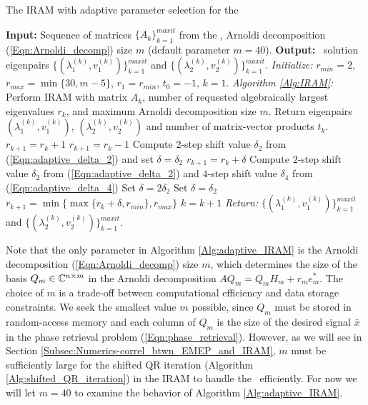 \begin{algorithm}[H]
\caption{The IRAM with adaptive parameter selection for the \emep}	\label{Alg:adaptive_IRAM}

\begin{algorithmic}[1]
	\Statex 	\textbf{Input:} Sequence of matrices $\{ A_k \}_{k=1}^{maxit}$ from the \emep, Arnoldi decomposition (\ref{Eqn:Arnoldi_decomp})  size $m$ (default parameter $m = 40$).
	\Statex 	\textbf{Output:} \emep \ solution eigenpairs $\{ (\lambda_1^{(k)}, v_1^{(k)}) \}_{k=1}^{maxit}$ and  $\{ (\lambda_2^{(k)}, v_2^{(k)}) \}_{k=1}^{maxit}$.
	\State		\textit{Initialize:} $r_{min}=2$, $r_{max} = \min\{ 30, m-5 \}$, $r_1=r_{min}$, $t_0=-1$, $k=1$.
		\State		\textit{Algorithm \ref{Alg:IRAM}:} Perform IRAM with matrix $A_k$, number of requested algebraically largest eigenvalues $r_k$, and maximum Arnoldi decomposition size $m$.  Return eigenpairs $(\lambda_1^{(k)}, v_1^{(k)} )$, $(\lambda_2^{(k)}, v_2^{(k)} )$ and number of matrix-vector products $t_k$.
			\State 		$r_{k+1} = r_k + 1$
			\State		$r_{k+1} = r_k - 1$
			\State		Compute $2$-step shift value $\delta_2$ from (\ref{Eqn:adaptive_delta_2}) and set $\delta = \delta_2$
			\State		$r_{k+1} = r_k + \delta$
		\Else
			\State 		Compute $2$-step shift value $\delta_2$ from (\ref{Eqn:adaptive_delta_2}) and $4$-step shift value $\delta_4$ from (\ref{Eqn:adaptive_delta_4})
				\State		Set $\delta = 2\delta_2$
			\Else
				\State 			Set $\delta = \delta_2$
			\EndIf
			\State		$r_{k+1} =\min \{ \max \{ r_k + \delta, r_{min} \}, r_{max} \}$
		\EndIf
		\State		$k = k+1$
	\EndWhile
	\State		\textit{Return:} $\{ (\lambda_1^{(k)}, v_1^{(k)}) \}_{k=1}^{maxit}$ and  $\{ (\lambda_2^{(k)}, v_2^{(k)}) \}_{k=1}^{maxit}$.
\end{algorithmic}

\end{algorithm}



Note that the only parameter in Algorithm \ref{Alg:adaptive_IRAM} is the Arnoldi decomposition (\ref{Eqn:Arnoldi_decomp}) size $m$, which determines the size of the basis $Q_m \in {\mathbb C}^{n \times m}$ in the Arnoldi decomposition $AQ_m = Q_mH_m + r_me_m^*$.  
The choice of $m$ is a trade-off between computational efficiency and data storage constraints.
We seek the smallest value $m$ possible, since $Q_m$ must be stored in random-access memory and each column of $Q_m$ is the size of the desired signal $\bar{x}$ in the phase retrieval problem (\ref{Eqn:phase_retrieval}).
However, as we will see in Section \ref{Subsec:Numerics-correl_btwn_EMEP_and_IRAM}, $m$ must be sufficiently large for the shifted QR iteration (Algorithm \ref{Alg:shifted_QR_iteration}) in the IRAM to handle the \emep \ efficiently.  
For now we will let $m=40$ to examine the behavior of Algorithm \ref{Alg:adaptive_IRAM}.



